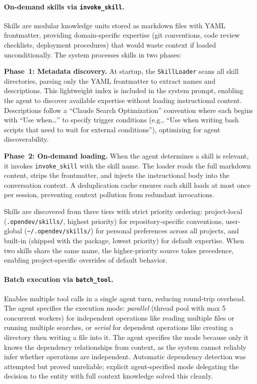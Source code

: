\paragraph{On-demand skills via \texttt{invoke\_skill}.} Skills are modular knowledge units stored as markdown files with YAML frontmatter, providing domain-specific expertise (git conventions, code review checklists, deployment procedures) that would waste context if loaded unconditionally. The system processes skills in two phases:

\textbf{Phase~1: Metadata discovery.} At startup, the \texttt{SkillLoader} scans all skill directories, parsing only the YAML frontmatter to extract names and descriptions. This lightweight index is included in the system prompt, enabling the agent to discover available expertise without loading instructional content. Descriptions follow a ``Claude Search Optimization'' convention where each begins with ``Use when\ldots'' to specify trigger conditions (e.g., ``Use when writing bash scripts that need to wait for external conditions''), optimizing for agent discoverability.

\textbf{Phase~2: On-demand loading.} When the agent determines a skill is relevant, it invokes \texttt{invoke\_skill} with the skill name. The loader reads the full markdown content, strips the frontmatter, and injects the instructional body into the conversation context. A deduplication cache ensures each skill loads at most once per session, preventing context pollution from redundant invocations.

Skills are discovered from three tiers with strict priority ordering: project-local (\texttt{.opendev/skills/}, highest priority) for repository-specific conventions, user-global (\texttt{\~{}/.opendev/skills/}) for personal preferences across all projects, and built-in (shipped with the package, lowest priority) for default expertise. When two skills share the same name, the higher-priority source takes precedence, enabling project-specific overrides of default behavior.

\paragraph{Batch execution via \texttt{batch\_tool}.} Enables multiple tool calls in a single agent turn, reducing round-trip overhead. The agent specifies the execution mode: \emph{parallel} (thread pool with max 5 concurrent workers) for independent operations like reading multiple files or running multiple searches, or \emph{serial} for dependent operations like creating a directory then writing a file into it. The agent specifies the mode because only it knows the dependency relationships from context, as the system cannot reliably infer whether operations are independent. Automatic dependency detection was attempted but proved unreliable; explicit agent-specified mode delegating the decision to the entity with full context knowledge solved this cleanly.

